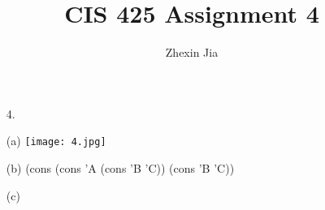 \documentclass[12pt]{article}
\begin{document}
\title{CIS 425 Assignment 4}
\author{Zhexin Jia}
\maketitle

\begin{enumerate}
\item[4.]
\item[(a)]
\texttt{[image: 4.jpg]}
\item[(b)]
(cons (cons 'A (cons 'B 'C)) (cons 'B 'C))\\
\item[(c)]


\end{enumerate}
\end{document}
